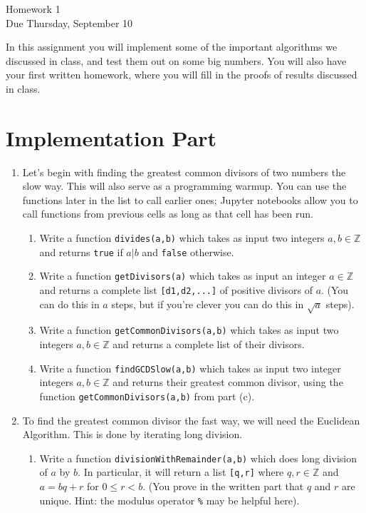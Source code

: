 \documentclass[11pt]{article}
\newcommand{\bZ}{\mathbb{Z}}
\begin{document}
\begin{center}
\Large {Homework 1}\\
\small {Due Thursday, September 10}
\end{center}
In this assignment you will implement some of the important algorithms we discussed in class, and test them out on some big numbers.  You will also have your first written homework, where you will fill in the proofs of results discussed in class.
\section*{Implementation Part}
\begin{enumerate}
  \item{
  Let's begin with finding the greatest common divisors of two numbers the slow way.  This will also serve as a programming warmup.  You can use the functions later in the list to call earlier ones; Jupyter notebooks allow you to call functions from previous cells as long as that cell has been run.
  \begin{enumerate}
    \item{
    Write a function \verb|divides(a,b)| which takes as input two integers $a,b\in\bZ$ and returns \verb|true| if $a|b$ and \verb|false| otherwise.
    }
    \item{
    Write a function \verb|getDivisors(a)| which takes as input an integer $a\in\bZ$ and returns a complete list \verb|[d1,d2,...]| of positive divisors of $a$.  (You can do this in $a$ steps, but if you're clever you can do this in $\sqrt a$ steps).
    }
    \item{
    Write a function \verb|getCommonDivisors(a,b)| which takes as input two integers $a,b\in\bZ$ and returns a complete list of their divisors.
    }
    \item{
    Write a function \verb|findGCDSlow(a,b)| which takes as input two integer integers $a,b\in\bZ$ and returns their greatest common divisor, using the function \verb|getCommonDivisors(a,b)| from part (c).
    }
  \end{enumerate}
  }
  \item{
  To find the greatest common divisor the fast way, we will need the Euclidean Algorithm.  This is done by iterating long division.
  \begin{enumerate}
    \item{
    Write a function \verb|divisionWithRemainder(a,b)| which does long division of $a$ by $b$.  In particular, it will return a list \verb|[q,r]| where $q,r\in\bZ$ and $a=bq + r$ for $0\le r<b$.  (You prove in the written part that $q$ and $r$ are unique.  Hint: the modulus operator \verb|%| may be helpful here).
}
\end{enumerate}}
\end{enumerate}
\end{document}
